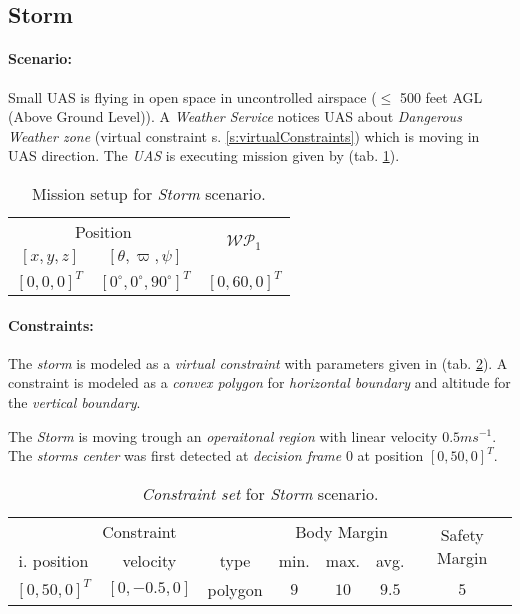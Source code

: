 \subsection{Storm}\label{s:testStorm}
    \paragraph{Scenario:} Small UAS is flying in open space in uncontrolled airspace ($\le$ 500 feet AGL (Above Ground Level)). A \emph{Weather Service} notices UAS about \emph{Dangerous Weather zone} (virtual constraint s. \ref{s:virtualConstraints}) which is moving in UAS direction. The \emph{UAS} is  executing mission given by (tab. \ref{tab:missionSetupStormScenario}).
    
    \begin{table}[H]
        \centering
        \begin{tabular}{c|c||c}
            \multicolumn{2}{c||}{Position} & \multirow{2}{*}{$\mathscr{WP}_1$} \\\cline{1-2}
            $[x,y,z]$           & $[\theta,\varpi,\psi]$           & \\\hline\hline
            $[0,0,0]^T $        & $[0^\circ,0^\circ,90^\circ]^T$    & $[0,60,0]^T$        \\ 
        \end{tabular}
        \caption{Mission setup for \emph{Storm} scenario.}
        \label{tab:missionSetupStormScenario}
    \end{table}
    
    \paragraph{Constraints:} The \emph{storm} is modeled as a \emph{virtual constraint} with parameters given in (tab. \ref{tab:obstacleSetStorm}). A constraint is modeled as a \emph{convex polygon} for \emph{horizontal boundary} and altitude for the \emph{vertical boundary}.
    
    The \emph{Storm} is moving trough an \emph{operaitonal region} with linear velocity $0.5 ms^{-1}$. The \emph{storms center} was first detected at \emph{decision frame} $0$ at position $[0,50,0]^T$.
    
    \begin{table}[H]
        \centering
        \begin{tabular}{c|c|c|c|c|c|c}
            \multicolumn{3}{c|}{Constraint} & \multicolumn{3}{c|}{Body Margin} & \multirow{2}{*}{Safety Margin}\\\cline{1-6}
            i. position & velocity & type & min. & max. & avg. &   \\\hline\hline
            $[0,50,0]^T$ & $[0,-0.5,0]$ & polygon & $9$ & $10$ & $9.5$  & $5$ \\
         \end{tabular}
        \caption{\emph{Constraint set} for \emph{Storm} scenario.}
        \label{tab:obstacleSetStorm}
    \end{table}
    
